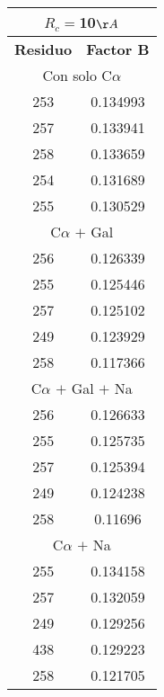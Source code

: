 \begin{tabular}[c]{|c|c|}
\multicolumn{2}{c}{$R_c=$10$\AA$}\\\hline
\textbf{Residuo}&\textbf{Factor B}\\\hline
\multicolumn{2}{c}{Con solo C$\alpha$}\\\hline
       253&  0.134993\\
       257&  0.133941\\
       258&  0.133659\\
       254&  0.131689\\
       255&  0.130529\\\hline
\multicolumn{2}{c}{C$\alpha$ $+$ Gal}\\\hline
       256&  0.126339\\
       255&  0.125446\\
       257&  0.125102\\
       249&  0.123929\\
       258&  0.117366\\\hline
\multicolumn{2}{c}{C$\alpha$ $+$ Gal $+$ Na}\\\hline
       256&  0.126633\\
       255&  0.125735\\
       257&  0.125394\\
       249&  0.124238\\
       258&   0.11696\\\hline
\multicolumn{2}{c}{C$\alpha$ $+$ Na}\\\hline
       255&  0.134158\\
       257&  0.132059\\
       249&  0.129256\\
       438&  0.129223\\
       258&  0.121705\\\hline
\end{tabular}
